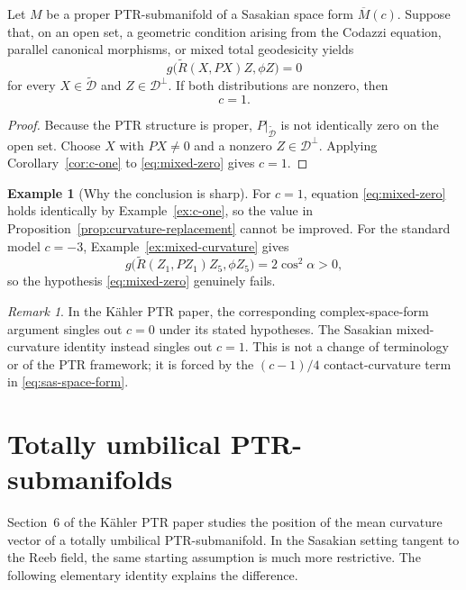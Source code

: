 \documentclass[11pt]{article}
\theoremstyle{definition}\newtheorem{definition}[theorem]{Definition}\newtheorem{example}[theorem]{Example}
\theoremstyle{remark}\newtheorem{remark}[theorem]{Remark}
\newcommand{\Mbar}{\overline M}\newcommand{\Dperp}{\mathcal D^{\perp}}\newcommand{\Dtilde}{\widetilde{\mathcal D}}
\begin{document}
\begin{proposition}\label{prop:curvature-replacement}
Let $M$ be a proper PTR-submanifold of a Sasakian space form $\Mbar(c)$.  Suppose that, on an open set, a geometric condition arising from the Codazzi equation, parallel canonical morphisms, or mixed total geodesicity yields
\begin{equation}\label{eq:mixed-zero}
 g\bigl(\widetilde R(X,PX)Z,\phi Z\bigr)=0
\end{equation}
for every $X\in\Dtilde$ and $Z\in\Dperp$.  If both distributions are nonzero, then
\[
 c=1.
\]
\end{proposition}

\begin{proof}
Because the PTR structure is proper, $P|_{\Dtilde}$ is not identically zero on the open set.  Choose $X$ with $PX\neq0$ and a nonzero $Z\in\Dperp$.  Applying Corollary~\ref{cor:c-one} to \eqref{eq:mixed-zero} gives $c=1$.
\end{proof}

\begin{example}[Why the conclusion is sharp]\label{ex:curvature-replacement}
For $c=1$, equation \eqref{eq:mixed-zero} holds identically by Example~\ref{ex:c-one}, so the value in Proposition~\ref{prop:curvature-replacement} cannot be improved.  For the standard model $c=-3$, Example~\ref{ex:mixed-curvature} gives
\[
 g\bigl(\widetilde R(Z_1,PZ_1)Z_5,\phi Z_5\bigr)
 =2\cos^2\alpha>0,
\]
so the hypothesis \eqref{eq:mixed-zero} genuinely fails.
\end{example}

\begin{remark}
In the K\"ahler PTR paper, the corresponding complex-space-form argument singles out $c=0$ under its stated hypotheses.  The Sasakian mixed-curvature identity instead singles out $c=1$.  This is not a change of terminology or of the PTR framework; it is forced by the $(c-1)/4$ contact-curvature term in \eqref{eq:sas-space-form}.
\end{remark}



\section{Totally umbilical PTR-submanifolds}\label{sec:umbilical}

Section~6 of the K\"ahler PTR paper studies the position of the mean
curvature vector of a totally umbilical PTR-submanifold.  In the Sasakian
setting tangent to the Reeb field, the same starting assumption is much
more restrictive.  The following elementary identity explains the
difference.
\end{document}
